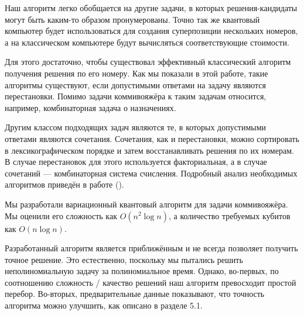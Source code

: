 Наш алгоритм легко обобщается на другие задачи, в которых решения-кандидаты могут быть каким-то образом пронумерованы. Точно так же квантовый компьютер будет использоваться для создания суперпозиции нескольких номеров, а на классическом компьютере будут вычисляться соответствующие стоимости.

Для этого достаточно, чтобы существовал эффективный классический алгоритм получения решения по его номеру. 
Как мы показали в этой работе, такие алгоритмы существуют, если допустимыми ответами на задачу являются перестановки. Помимо задачи коммивояжёра к таким задачам относится, например, комбинаторная задача о назначениях.

Другим классом подходящих задач являются те, в которых допустимыми ответами являются сочетания. Сочетания, как и перестановки, можно сортировать в лексикографическом порядке и затем восстанавливать решения по их номерам. В случае перестановок для этого используется факториальная, а в случае сочетаний --- комбинаторная система счисления.
Подробный анализ необходимых алгоритмов приведён в работе \cite{Combinations} (\citeyear{Combinations}).





Мы разработали вариационный квантовый алгоритм для задачи коммивояжёра. Мы оценили его сложность как $O(n^2 \log n)$, а количество требуемых кубитов как $O(n \log n)$.

Разработанный алгоритм является приближённым и не всегда позволяет получить точное решение. 
Это естественно, поскольку мы пытались решить неполиномиальную задачу за полиномиальное время. 
Однако, во-первых, по соотношению сложность / качество решений наш алгоритм превосходит простой перебор. 
Во-вторых, предварительные данные показывают, что точность алгоритма можно улучшить, как описано в разделе 5.1.



